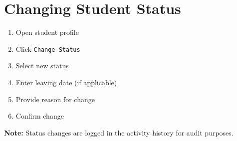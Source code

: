 \documentclass[12pt,a4paper]{report}
\begin{document}
\section{Changing Student Status}

\begin{enumerate}[leftmargin=*]
    \item Open student profile
    \item Click \texttt{Change Status}
    \item Select new status
    \item Enter leaving date (if applicable)
    \item Provide reason for change
    \item Confirm change
\end{enumerate}

\textbf{Note:} Status changes are logged in the activity history for audit purposes.
\end{document}
